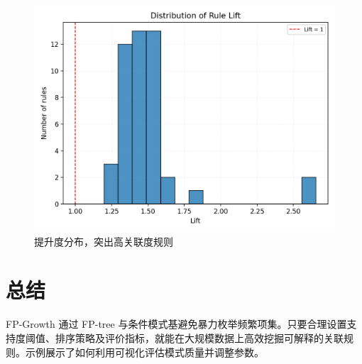 \documentclass[UTF8,zihao=-4]{ctexart}
\begin{document}
\begin{figure}[H]
  \centering
  \includegraphics[width=0.78\linewidth]{fpgrowth_lift_distribution.png}
  \caption{提升度分布，突出高关联度规则}
  \label{fig:fpgrowth_lift_distribution_cn}
\end{figure}

\FloatBarrier
\section{总结}
FP-Growth 通过 FP-tree 与条件模式基避免暴力枚举频繁项集。只要合理设置支持度阈值、排序策略及评价指标，就能在大规模数据上高效挖掘可解释的关联规则。示例展示了如何利用可视化评估模式质量并调整参数。
\end{document}

